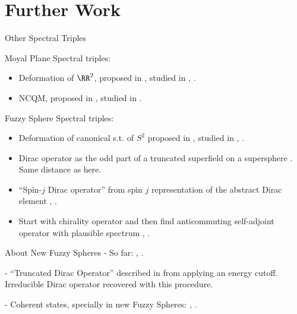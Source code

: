 \section{Further Work}

\begin{frame}{Other Spectral Triples} %





Moyal Plane Spectral triples: 
    \begin{itemize}
    
    \item Deformation of $\RR^2$, proposed in \cite{Gayral2004}, studied in \cite{Martinetti2013}, \cite{Cagnache2011}.
    
    \item NCQM, proposed in \cite{Scholtz2013}, studied in \cite{ChaobaDevi2018}.
    
    \end{itemize}

Fuzzy Sphere Spectral triples:
    \begin{itemize}
        
    \item Deformation of canonical s.t. of $S^2$ proposed in \cite{Grosse1995}, studied in \cite{Devi2015}, \cite{ChaobaDevi2018}.
    
    \item Dirac operator as the odd part of a truncated superfield on a supersphere \cite{Grosse1997}. Same distance as here.
    
    \item ``Spin-$j$ Dirac operator'' from spin $j$ representation of the abstract Dirac element \cite{Balachandran2007}, \cite{Balachandran2009}.
    
    \item Start with chirality operator and then find anticommuting self-adjoint operator with plausible spectrum \cite{Carow1997}, \cite{Carow1998}.
        
    \end{itemize}


\end{frame}


\begin{frame}{About New Fuzzy Spheres} %
- So far: \cite{Fiore2018}, \cite{Fiore2019}.

- ``Truncated Dirac Operator'' described in \cite{DAndrea2014} from applying an energy cutoff. Irreducible Dirac operator recovered with this procedure.

- Coherent states, specially in new Fuzzy Spheres: \cite{FioreCoherent2020}, \cite{FioreTheCase2020}.
\end{frame}

